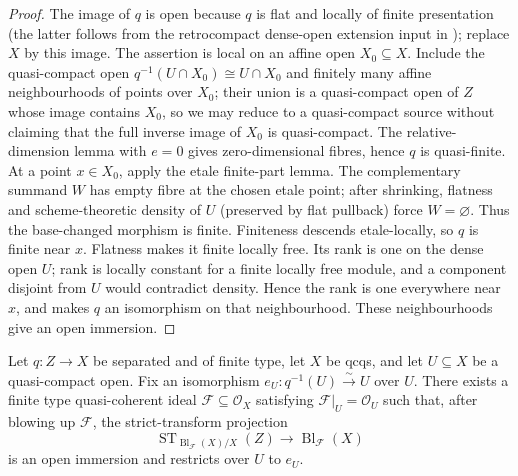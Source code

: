 \begin{proof}
  The image of $q$ is open because $q$ is flat and locally of finite
  presentation (the latter follows from the retrocompact dense-open extension
  input in ); replace
  $X$ by this image.  The assertion is local on an affine open
  $X_0\subseteq X$.  Include the quasi-compact open
  $q^{-1}(U\cap X_0)\cong U\cap X_0$ and finitely many affine neighbourhoods
  of points over $X_0$; their union is a quasi-compact open of $Z$ whose image
  contains $X_0$, so we may reduce to a quasi-compact source without claiming
  that the full inverse image of $X_0$ is quasi-compact.  The
  relative-dimension lemma with
  $e=0$ gives zero-dimensional fibres, hence $q$ is quasi-finite.  At a point
  $x\in X_0$, apply the etale finite-part lemma.  The complementary summand
  $W$ has empty fibre at the chosen etale point; after shrinking, flatness and
  scheme-theoretic density of $U$ (preserved by flat pullback) force $W=\varnothing$.
  Thus the base-changed morphism is finite.  Finiteness descends etale-locally,
  so $q$ is finite near $x$.  Flatness makes it finite locally free.  Its
  rank is one on the dense open $U$; rank is locally constant for a finite
  locally free module, and a component disjoint from $U$ would contradict
  density.  Hence the rank is one everywhere near $x$, and
   makes $q$ an isomorphism on
  that neighbourhood.  These neighbourhoods give an open immersion.
\end{proof}

\begin{lemma}
  \label{lemma:nagata-flattening-ideal-exists}

  Let $q\colon Z\to X$ be separated and of finite type, let $X$ be qcqs,
  and let $U\subseteq X$ be a quasi-compact open.  Fix an isomorphism
  $e_U\colon q^{-1}(U)\xrightarrow{\sim}U$ over $U$.  There exists a finite type
  quasi-coherent ideal $\mathcal F\subseteq\mathcal O_X$ satisfying
  $\mathcal F|_U=\mathcal O_U$ such that, after blowing up $\mathcal F$, the
  strict-transform projection
  \[
    \operatorname{ST}_{\operatorname{Bl}_{\mathcal F}(X)/X}(Z)
      \longrightarrow \operatorname{Bl}_{\mathcal F}(X)
  \]
  is an open immersion and restricts over $U$ to $e_U$.
\end{lemma}

